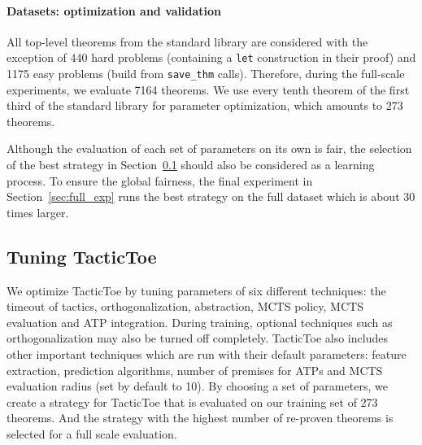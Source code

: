 \documentclass[runningheads,a4paper,draft]{svjour3}
\def\tactictoe{\textsf{TacticToe}\xspace}
\begin{document}
\paragraph{Datasets: optimization and validation}
All top-level theorems from the standard library are considered with the
exception of 440 hard problems (containing a \texttt{let} construction in their
proof) and 1175 easy problems (build from \texttt{save\_thm} calls).
Therefore, during the full-scale experiments, we evaluate 7164 theorems.
We use every tenth theorem of the first third of the standard library for
parameter optimization, which amounts to 273 theorems.

Although the evaluation of each set of parameters on its own is fair,
the selection of the best strategy in Section~\ref{sec:tuning} should also be
considered as a learning process. To ensure the global fairness, the final
experiment in Section~\ref{sec:full_exp} runs the best strategy on the full
dataset which is about 30 times larger.

\subsection{Tuning \tactictoe}\label{sec:tuning}

We optimize \tactictoe by tuning parameters of six different techniques:
the timeout of tactics, orthogonalization, abstraction, MCTS policy, MCTS
evaluation and ATP integration. During training, optional techniques such as
orthogonalization may also be turned off completely.
\tactictoe also includes other important techniques which are run with their
default parameters: feature extraction, prediction
algorithms, number of premises for ATPs and MCTS evaluation radius (set by default to
10).
By choosing a set of parameters, we create a strategy for
\tactictoe that is evaluated on our training set of 273 theorems. And the
strategy with the highest number of re-proven theorems is selected for
a full scale evaluation.
\end{document}
